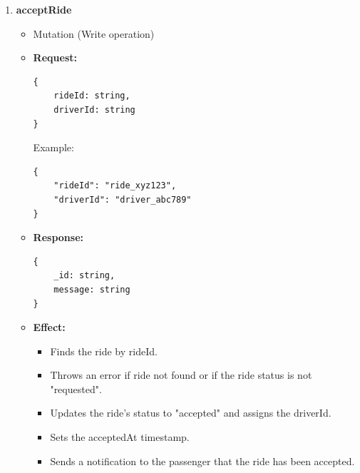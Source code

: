 \documentclass[a4paper,12pt]{article}
\begin{document}
\begin{enumerate}
    \item \textbf{acceptRide}
    \begin{itemize}
        \item Mutation (Write operation)
        \item \textbf{Request:}
        \begin{verbatim}
{
    rideId: string,
    driverId: string
}
        \end{verbatim}
        Example:
        \begin{verbatim}
{
    "rideId": "ride_xyz123",
    "driverId": "driver_abc789"
}
        \end{verbatim}
        \item \textbf{Response:}
        \begin{verbatim}
{
    _id: string,
    message: string
}
        \end{verbatim}
        \item \textbf{Effect:}
        \begin{itemize}
            \item Finds the ride by rideId.
            \item Throws an error if ride not found or if the ride status is not "requested".
            \item Updates the ride's status to "accepted" and assigns the driverId.
            \item Sets the acceptedAt timestamp.
            \item Sends a notification to the passenger that the ride has been accepted.
        \end{itemize}
    \end{itemize}


\end{enumerate}
\end{document}
